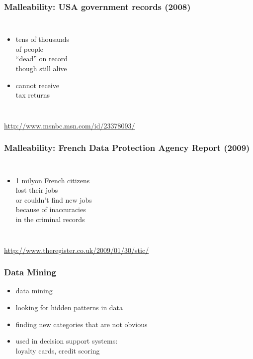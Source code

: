\documentclass[dvipsnames]{beamer}
\theoremstyle{plain}
\begin{document}
\begin{frame}
  \frametitle{Malleability: USA government records (2008)}

  \begin{columns}

    \begin{itemize}
      \item tens of thousands\\
        of people\\
        ``dead'' on record\\
        though still alive
      \item cannot receive\\
        tax returns
    \end{itemize}
  \end{columns}

  \medskip
  \tiny{\url{http://www.msnbc.msn.com/id/23378093/}}
\end{frame}

\begin{frame}
  \frametitle{Malleability: French Data Protection Agency Report (2009)}

  \begin{columns}

    \begin{itemize}
      \item 1 milyon French citizens\\
        lost their jobs\\
        or couldn't find new jobs\\
        because of inaccuracies\\
        in the criminal records
    \end{itemize}
  \end{columns}

  \medskip
  \tiny{\url{http://www.theregister.co.uk/2009/01/30/stic/}}
\end{frame}

\begin{frame}
  \frametitle{Data Mining}

  \begin{itemize}
    \item \alert{data mining}
    \item looking for hidden patterns in data
    \item finding new categories that are not obvious

    \medskip
    \item used in decision support systems:\\
      loyalty cards, credit scoring
  \end{itemize}
\end{frame}
\end{document}
